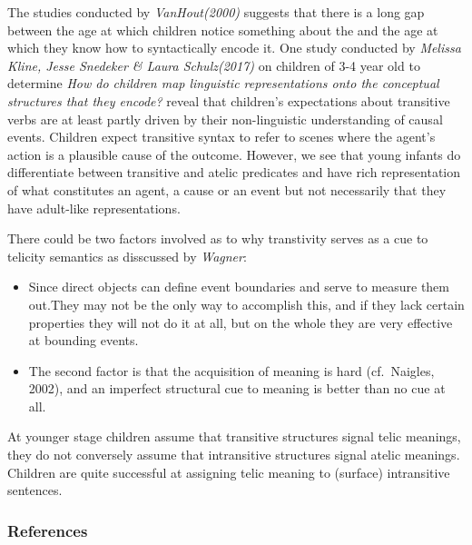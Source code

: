 \documentclass[11pt]{article}
\providecommand{\tightlist}{%
      \setlength{\itemsep}{0pt}\setlength{\parskip}{0pt}}
\begin{document}
The studies conducted by \emph{VanHout(2000)} suggests that there is a
long gap between the age at which children notice something about the
and the age at which they know how to syntactically encode it. One study
conducted by \emph{Melissa Kline, Jesse Snedeker \& Laura Schulz(2017)}
on children of 3-4 year old to determine \emph{How do children map
linguistic representations onto the conceptual structures that they
encode?} reveal that children's expectations about transitive verbs are
at least partly driven by their non-linguistic understanding of causal
events. Children expect transitive syntax to refer to scenes where the
agent's action is a plausible cause of the outcome. However, we see that
young infants do differentiate between transitive and atelic predicates
and have rich representation of what constitutes an agent, a cause or an
event but not necessarily that they have adult-like representations.

There could be two factors involved as to why transtivity serves as a
cue to telicity semantics as disscussed by \emph{Wagner}:

\begin{itemize}
\tightlist
\item
  Since direct objects can define event boundaries and serve to measure
  them out.They may not be the only way to accomplish this, and if they
  lack certain properties they will not do it at all, but on the whole
  they are very effective at bounding events.
\item
  The second factor is that the acquisition of meaning is hard
  (cf.~Naigles, 2002), and an imperfect structural cue to meaning is
  better than no cue at all.
\end{itemize}

At younger stage children assume that transitive structures signal telic
meanings, they do not conversely assume that intransitive structures
signal atelic meanings. Children are quite successful at assigning telic
meaning to (surface) intransitive sentences.

    \hypertarget{references}{%
\subsubsection{References}\label{references}}
\end{document}
